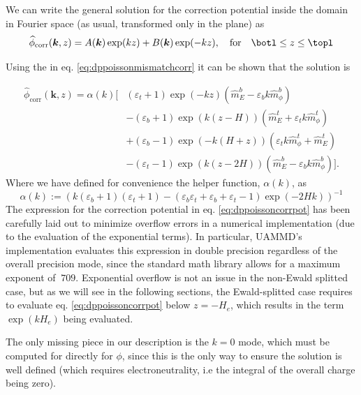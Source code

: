 \documentclass[ twoside,openright,titlepage,numbers=noenddot,%
headinclude,footinclude,cleardoublepage=empty,abstract=on,
BCOR=5mm,paper=a4,fontsize=11pt, dvipsnames
]{scrreprt}
\renewcommand{\vec}[1]{\bm{#1}}
\newcommand{\uammd}{\gls{UAMMD}\xspace}
\newcommand{\fou}[1]{\widehat{#1}}
\newcommand{\corr}{\text{corr}}
\begin{document}
We can write the general solution for the correction potential inside the domain in Fourier space (as usual, transformed only in the plane) as 
\begin{equation}
  \label{eq:dppoissoncorrpoteq}
  \fou{\phi}_{\corr}(\vec{k}, z) = A(\vec{k})\exp(k z) + B(\vec{k})\exp(-kz), \quad \text{for} \quad \botl\le z\le \topl
\end{equation}

Using the \bcs in eq. \eqref{eq:dppoissonmismatchcorr} it can be shown that the solution is

\begin{equation}
  \label{eq:dppoissoncorrpot}
  \begin{aligned}
    \fou{\phi}_{\corr}(\vec{k}, z) = \alpha(k)\bigg[ &(\varepsilon_t +1)\exp(-k z)(\fou{m}_E^b - \varepsilon_bk \fou{m}_\phi^b)\\
    &-(\varepsilon_b+1)\exp\left(k\left(z-H\right)\right)(\fou{m}_E^t + \varepsilon_tk\fou{m}_\phi^t)\\
    &+(\varepsilon_b-1)\exp\left(-k(H+z)\right)(\varepsilon_tk\fou{m}_\phi^t + \fou{m}_E^t)\\
    &-(\varepsilon_t -1)\exp\left(k(z-2H)\right)(\fou{m}_E^b - \varepsilon_bk\fou{m}_\phi^b)
    \bigg].
\end{aligned}
\end{equation}
Where we have defined for convenience the helper function, $\alpha(k)$, as
\begin{equation}
  \alpha(k) := \left(k(\varepsilon_b +1)(\varepsilon_t+1) - (\varepsilon_b\varepsilon_t + \varepsilon_b + \varepsilon_t -1)\exp(-2Hk) \right)^{-1}
\end{equation}
The expression for the correction potential in eq. \eqref{eq:dppoissoncorrpot} has been carefully laid out to minimize overflow errors in a numerical implementation (due to the evaluation of the exponential terms). In particular, \uammd's implementation evaluates this expression in double precision regardless of the overall precision mode, since the standard math library allows for a maximum exponent of $~709$. Exponential overflow is not an issue in the non-Ewald splitted case, but as we will see in the following sections, the Ewald-splitted case requires to evaluate eq. \eqref{eq:dppoissoncorrpot} below $z=-H_e$, which results in the term $\exp(kH_e)$ being evaluated.

The only missing piece in our description is the $k=0$ mode, which must be computed for directly for $\phi$, since this is the only way to ensure the solution is well defined (which requires electroneutrality, i.e the integral of the overall charge being zero).
 
\end{document}
